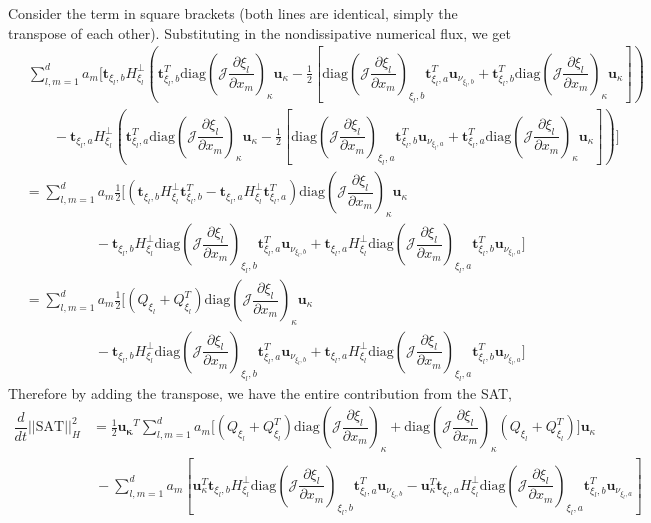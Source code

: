 \documentclass[12pt,a4paper]{article}
\newcommand{\pder}[2][]{\dfrac{\partial #1}{\partial #2}} %
\newcommand{\der}[2][]{\dfrac{d #1}{d #2}} %
\newcommand{\norm}[1]{\left\vert \left\vert #1 \right\vert \right\vert} %
\newcommand{\fn}[1]{\mathcal{#1}} %
\begin{document}
Consider the term in square brackets (both lines are identical, simply the transpose of each other). Substituting in the nondissipative numerical flux, we get
\begin{align*}
& \   \sum_{l,m = 1}^d a_m \Bigg[  \bm{t}_{\xi_l,b} H^{\bot}_{\xi_l} \left( \bm{t}^T_{\xi_l,b} \text{diag} \left( \fn{J} \pder[\xi_l]{x_m} \right)_{\kappa}  \bm{u}_{\kappa} -  \frac{1}{2} \left[ \text{diag} \left( \fn{J} \pder[\xi_l]{x_m} \right)_{\xi_l,b} \bm{t}^T_{\xi_l,a} \bm{u}_{\nu_{\xi_l,b}} +  \bm{t}^T_{\xi_l,b} \text{diag} \left( \fn{J} \pder[\xi_l]{x_m} \right)_{\kappa} \bm{u}_{\kappa} \right] \right)  \\
&\qquad - \bm{t}_{\xi_l,a} H^{\bot}_{\xi_l} \left( \bm{t}^T_{\xi_l,a} \text{diag} \left( \fn{J} \pder[\xi_l]{x_m} \right)_{\kappa}  \bm{u}_{\kappa}  -  \frac{1}{2} \left[ \text{diag} \left( \fn{J} \pder[\xi_l]{x_m} \right)_{\xi_l,a} \bm{t}^T_{\xi_l,b} \bm{u}_{\nu_{\xi_l,a}} + \bm{t}^T_{\xi_l,a} \text{diag} \left( \fn{J} \pder[\xi_l]{x_m} \right)_{\kappa} \bm{u}_{\kappa} \right]  \right) \Bigg] \\
&=  \sum_{l,m = 1}^d a_m \frac{1}{2} \Bigg[ \left(  \bm{t}_{\xi_l,b} H^{\bot}_{\xi_l} \bm{t}^T_{\xi_l,b} -  \bm{t}_{\xi_l,a} H^{\bot}_{\xi_l} \bm{t}^T_{\xi_l,a} \right) \text{diag} \left( \fn{J} \pder[\xi_l]{x_m} \right)_{\kappa}  \bm{u}_{\kappa}  \\
&\qquad \qquad \quad -  \bm{t}_{\xi_l,b} H^{\bot}_{\xi_l}  \text{diag} \left( \fn{J} \pder[\xi_l]{x_m} \right)_{\xi_l,b} \bm{t}^T_{\xi_l,a} \bm{u}_{\nu_{\xi_l,b}} + 
 \bm{t}_{\xi_l,a} H^{\bot}_{\xi_l}  \text{diag} \left( \fn{J} \pder[\xi_l]{x_m} \right)_{\xi_l,a} \bm{t}^T_{\xi_l,b} \bm{u}_{\nu_{\xi_l,a}}  \Bigg] \\
 &=  \sum_{l,m = 1}^d a_m \frac{1}{2} \Bigg[ \left( Q_{\xi_l} + Q_{\xi_l}^T \right) \text{diag} \left( \fn{J} \pder[\xi_l]{x_m} \right)_{\kappa}  \bm{u}_{\kappa}  \\
&\qquad \qquad \quad -  \bm{t}_{\xi_l,b} H^{\bot}_{\xi_l}  \text{diag} \left( \fn{J} \pder[\xi_l]{x_m} \right)_{\xi_l,b} \bm{t}^T_{\xi_l,a} \bm{u}_{\nu_{\xi_l,b}} + 
 \bm{t}_{\xi_l,a} H^{\bot}_{\xi_l}  \text{diag} \left( \fn{J} \pder[\xi_l]{x_m} \right)_{\xi_l,a} \bm{t}^T_{\xi_l,b} \bm{u}_{\nu_{\xi_l,a}}  \Bigg]
\end{align*}
Therefore by adding the transpose, we have the entire contribution from the SAT, 
\begin{align*}
\der{t} \norm{ \text{SAT} }^2_{H} &= \frac{1}{2} \bm{u_\kappa}^T
\sum_{l,m = 1}^d a_m \Bigg[ \left( Q_{\xi_l} + Q_{\xi_l}^T \right) \text{diag} \left( \fn{J} \pder[\xi_l]{x_m} \right)_{\kappa} +  \text{diag} \left( \fn{J} \pder[\xi_l]{x_m} \right)_{\kappa}  \left( Q_{\xi_l} + Q_{\xi_l}^T \right) \Bigg] \bm{u}_{\kappa}  \\
& \ - \sum_{l,m = 1}^d a_m \left[  \bm{u}_\kappa^T \bm{t}_{\xi_l,b} H^{\bot}_{\xi_l}  \text{diag} \left( \fn{J} \pder[\xi_l]{x_m} \right)_{\xi_l,b} \bm{t}^T_{\xi_l,a} \bm{u}_{\nu_{\xi_l,b}} - 
 \bm{u}_\kappa^T \bm{t}_{\xi_l,a} H^{\bot}_{\xi_l}  \text{diag} \left( \fn{J} \pder[\xi_l]{x_m} \right)_{\xi_l,a} \bm{t}^T_{\xi_l,b} \bm{u}_{\nu_{\xi_l,a}} \right] 
\end{align*}
\end{document}

